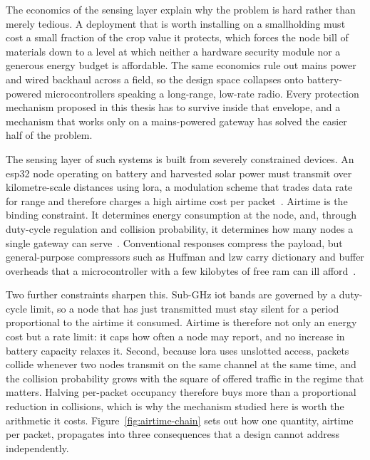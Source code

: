 \documentclass[12pt,a4paper,oneside]{book}
\begin{document}
The economics of the sensing layer explain why the problem is hard rather than
merely tedious. A deployment that is worth installing on a smallholding must
cost a small fraction of the crop value it protects, which forces the node bill
of materials down to a level at which neither a hardware security module nor a
generous energy budget is affordable. The same economics rule out mains power
and wired backhaul across a field, so the design space collapses onto
battery-powered microcontrollers speaking a long-range, low-rate radio. Every
protection mechanism proposed in this thesis has to survive inside that
envelope, and a mechanism that works only on a mains-powered gateway has solved
the easier half of the problem.

The sensing layer of such systems is built from severely constrained devices.
An \gls{esp32} node operating on battery and harvested solar power must
transmit over kilometre-scale distances using \gls{lora}, a modulation scheme
that trades data rate for range and therefore charges a high airtime cost per
packet~\cite{raza2018lorawan, adelantado2017understanding}. Airtime is the
binding constraint. It determines energy consumption at the node, and, through
duty-cycle regulation and collision probability, it determines how many nodes a
single gateway can serve~\cite{mohammed2025loraEnergy}. Conventional responses
compress the payload, but general-purpose compressors such as Huffman and
\gls{lzw} carry dictionary and buffer overheads that a microcontroller with a
few kilobytes of free \gls{ram} can ill
afford~\cite{marcelloni2009energy, chen2025compression}.

Two further constraints sharpen this. Sub-GHz \gls{iot} bands are governed by a
duty-cycle limit, so a node that has just transmitted must stay silent for a
period proportional to the airtime it consumed. Airtime is therefore not only
an energy cost but a rate limit: it caps how often a node may report, and no
increase in battery capacity relaxes it. Second, because \gls{lora} uses
unslotted access, packets collide whenever two nodes transmit on the same
channel at the same time, and the collision probability grows with the square
of offered traffic in the regime that matters. Halving per-packet occupancy
therefore buys more than a proportional reduction in collisions, which is why
the mechanism studied here is worth the arithmetic it costs. Figure~\ref{fig:airtime-chain}
sets out how one quantity, airtime per packet, propagates into three
consequences that a design cannot address independently.
\end{document}

